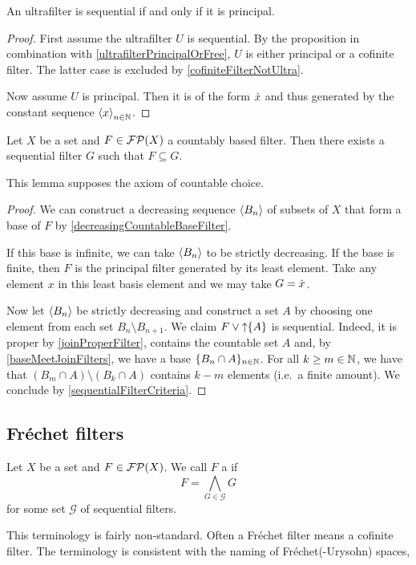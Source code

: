 \begin{corollary}
An ultrafilter is sequential \textup{if and only if} it is principal.
\end{corollary}
\begin{proof}
First assume the ultrafilter $U$ is sequential. By the proposition in combination with \ref{ultrafilterPrincipalOrFree}, $U$ is either principal or a cofinite filter. The latter case is excluded by \ref{cofiniteFilterNotUltra}.

Now assume $U$ is principal. Then it is of the form $\dot{x}$ and thus generated by the constant sequence $\left\langle x \right\rangle_{n\in \mathbb{N}}$.
\end{proof}

\begin{lemma} \label{countablyBasedFilterHasFinerSequential}
Let $X$ be a set and $F\in\operatorname{\mathcal{FP}}(X)$ a countably based filter. Then there exists a sequential filter $G$ such that $F\subseteq G$.
\end{lemma}
This lemma supposes the axiom of countable choice.
\begin{proof}
We can construct a decreasing sequence $\left\langle B_n \right\rangle$ of subsets of $X$ that form a base of $F$ by \ref{decreasingCountableBaseFilter}.

If this base is infinite, we can take $\left\langle B_n \right\rangle$ to be strictly decreasing. If the base is finite, then $F$ is the principal filter generated by its least element. Take any element $x$ in this least basis element and we may take $G = \dot{x}$.

Now let $\left\langle B_n \right\rangle$ be strictly decreasing and construct a set $A$ by choosing one element from each set $B_n\setminus B_{n+1}$. We claim $F\vee \operatorname{\uparrow}\{A\}$ is sequential. Indeed, it is proper by \ref{joinProperFilter}, contains the countable set $A$ and, by \ref{baseMeetJoinFilters}, we have a base $\{B_n\cap A\}_{n\in \mathbb{N}}$. 
For all $k\geq m\in \mathbb{N}$, we have that $(B_m\cap A)\setminus (B_k\cap A)$ contains $k-m$ elements (i.e.\ a finite amount).
We conclude by \ref{sequentialFilterCriteria}.
\end{proof}

\subsection{Fréchet filters}
\begin{definition}
Let $X$ be a set and $F\in\operatorname{\mathcal{FP}}(X)$. We call $F$ a  if
\[ F = \bigwedge_{G\in \mathcal{G}}G \]
for some set $\mathcal{G}$ of sequential filters.
\end{definition}
This terminology is fairly non-standard. Often a Fréchet filter means a cofinite filter. The terminology is consistent with the naming of Fréchet(-Urysohn) spaces, 

